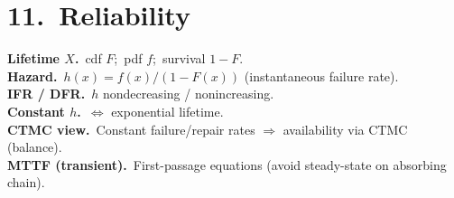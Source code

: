 \section*{11.\ Reliability}
\textbf{Lifetime $X$.}\ cdf $F$;\ pdf $f$;\ survival $1-F$.\\
\textbf{Hazard.}\ $h(x)=f(x)/(1-F(x))$ (instantaneous failure rate).\\
\textbf{IFR / DFR.}\ $h$ nondecreasing / nonincreasing.\\
\textbf{Constant $h$.}\ $\Leftrightarrow$ exponential lifetime.\\
\textbf{CTMC view.}\ Constant failure/repair rates $\Rightarrow$ availability via CTMC (balance).\\
\textbf{MTTF (transient).}\ First-passage equations (avoid steady-state on absorbing chain).
